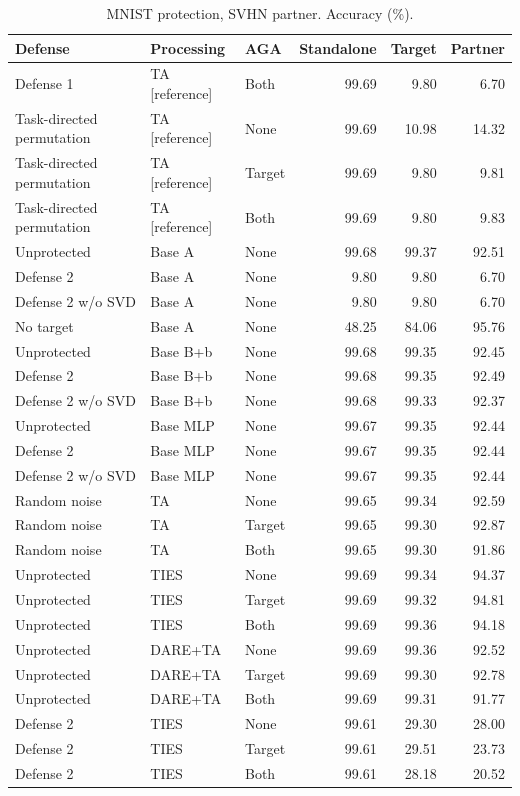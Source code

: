 \begin{table}[t]
\centering\small
\caption{MNIST protection, SVHN partner. Accuracy (\%).}
\begin{tabular}{lllrrr}
\toprule
Defense & Processing & AGA & Standalone & Target & Partner \\
\midrule
Defense 1 & TA [reference] & Both & 99.69 & 9.80 & 6.70 \\
Task-directed permutation & TA [reference] & None & 99.69 & 10.98 & 14.32 \\
Task-directed permutation & TA [reference] & Target & 99.69 & 9.80 & 9.81 \\
Task-directed permutation & TA [reference] & Both & 99.69 & 9.80 & 9.83 \\
Unprotected & Base A & None & 99.68 & 99.37 & 92.51 \\
Defense 2 & Base A & None & 9.80 & 9.80 & 6.70 \\
Defense 2 w/o SVD & Base A & None & 9.80 & 9.80 & 6.70 \\
No target & Base A & None & 48.25 & 84.06 & 95.76 \\
Unprotected & Base B+b & None & 99.68 & 99.35 & 92.45 \\
Defense 2 & Base B+b & None & 99.68 & 99.35 & 92.49 \\
Defense 2 w/o SVD & Base B+b & None & 99.68 & 99.33 & 92.37 \\
Unprotected & Base MLP & None & 99.67 & 99.35 & 92.44 \\
Defense 2 & Base MLP & None & 99.67 & 99.35 & 92.44 \\
Defense 2 w/o SVD & Base MLP & None & 99.67 & 99.35 & 92.44 \\
Random noise & TA & None & 99.65 & 99.34 & 92.59 \\
Random noise & TA & Target & 99.65 & 99.30 & 92.87 \\
Random noise & TA & Both & 99.65 & 99.30 & 91.86 \\
Unprotected & TIES & None & 99.69 & 99.34 & 94.37 \\
Unprotected & TIES & Target & 99.69 & 99.32 & 94.81 \\
Unprotected & TIES & Both & 99.69 & 99.36 & 94.18 \\
Unprotected & DARE+TA & None & 99.69 & 99.36 & 92.52 \\
Unprotected & DARE+TA & Target & 99.69 & 99.30 & 92.78 \\
Unprotected & DARE+TA & Both & 99.69 & 99.31 & 91.77 \\
Defense 2 & TIES & None & 99.61 & 29.30 & 28.00 \\
Defense 2 & TIES & Target & 99.61 & 29.51 & 23.73 \\
Defense 2 & TIES & Both & 99.61 & 28.18 & 20.52 \\
\bottomrule
\end{tabular}
\end{table}


